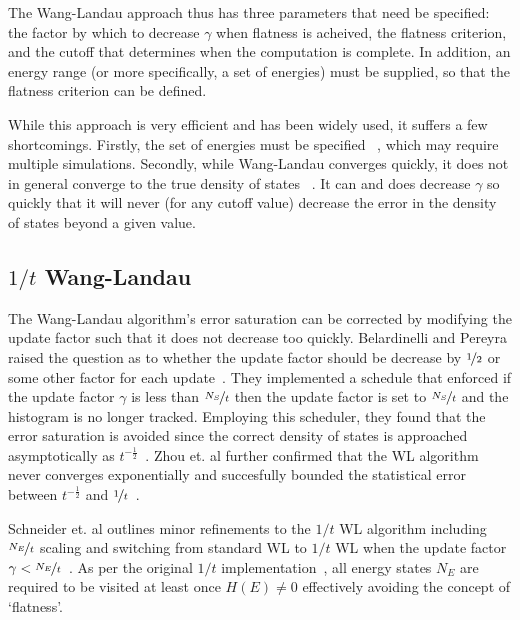 \documentclass[letterpaper,twocolumn,amsmath,amssymb,pre,aps,10pt]{revtex4-1}
\begin{document}
The Wang-Landau approach thus has three parameters that need be
specified: the factor by which to decrease $\gamma$ when flatness is
acheived, the flatness criterion, and the cutoff that determines when
the computation is complete.  In addition, an energy range (or more
specifically, a set of energies) must be supplied, so that the
flatness criterion can be defined.

While this approach
is very efficient and has been widely used, it suffers a few
shortcomings.  Firstly, the set of energies must be specified
~\cite{wang2001efficient, schulz2003avoiding, yan2003fast}, which may
require multiple simulations. Secondly, while Wang-Landau converges quickly,
it does not in general converge to the true density of states
~\cite{belardinelli2008analysis, zhou2008optimal}.  It can and does decrease
$\gamma$ so quickly that it will never (for any cutoff value) decrease the
error in the density of states beyond a given value.

\subsection{$1/t$ Wang-Landau}
The Wang-Landau algorithm's error saturation can be corrected by
modifying the update factor such that it does not decrease too quickly.
Belardinelli and Pereyra raised the question as to whether the update
factor should be decrease by $\nicefrac12$ or some other factor for
each update~\cite{belardinelli2007fast}. They implemented a schedule
that enforced if the update factor $\gamma$ is less than
$\nicefrac{N_S}{t}$ then the update factor is set to
$\nicefrac{N_S}{t}$ and the histogram is no longer tracked. Employing
this scheduler, they found that the error saturation is avoided since
the correct density of states is approached asymptotically as
$t^{-\frac12}$~\cite{belardinelli2008analysis}. Zhou et. al further
confirmed that the WL algorithm never converges exponentially and
succesfully bounded the statistical error between
$t^{-\frac12}$ and $\nicefrac{1}{t}$~\cite{zhou2008optimal}.

Schneider et. al outlines minor refinements to the $1/t$ WL algorithm
including $\nicefrac{N_E}{t}$ scaling and switching from standard WL to
$1/t$ WL when the update factor $\gamma <
\nicefrac{N_E}{t}$~\cite{schneider2017convergence}. As per the original
$1/t$ implementation~\cite{belardinelli2007fast}, all energy states $N_E$
are required to be visited at least once $H(E) \neq 0$ effectively
avoiding the concept of `flatness'.
\end{document}
